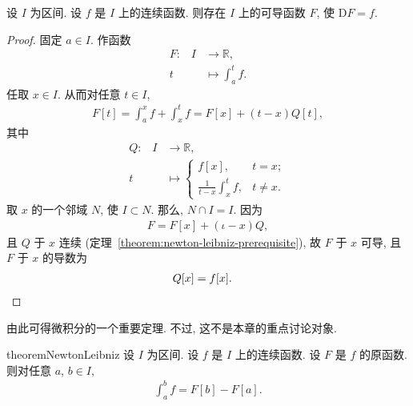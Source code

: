 \begin{theorem}
    设 $I$ 为区间. 设 $f$ 是 $I$ 上的连续函数. 则存在 $I$ 上的可导函数 $F$, 使 $\mathrm{D}F = f$.
\end{theorem}

\begin{proof}
    固定 $a \in I$. 作函数
    \begin{align*}
        \text{$F$:} \quad
        I & \to \mathbb{R},           \\
        t & \mapsto \int_{a}^{t} {f}.
    \end{align*}
    任取 $x \in I$. 从而对任意 $t \in I$,
    \begin{align*}
        F[t] = \int_{a}^{x} {f} + \int_{x}^{t} {f} = F[x] + (t - x) Q [t],
    \end{align*}
    其中
    \begin{align*}
        \text{$Q$:} \quad
        I & \to \mathbb{R},                                                       \\
        t & \mapsto \begin{cases}
                        f[x],                                             & t = x;    \\
                        {\displaystyle \frac{1}{t - x} \int_{x}^{t} {f}}, & t \neq x.
                    \end{cases}
    \end{align*}
    取 $x$ 的一个邻域 $N$, 使 $I \subset N$. 那么, $N \cap I = I$. 因为
    \begin{align*}
        F = F[x] + (\iota - x) Q,
    \end{align*}
    且 $Q$ 于 $x$ 连续 (定理~\ref{theorem:newton-leibniz-prerequisite}), 故 $F$ 于 $x$ 可导, 且 $F$ 于 $x$ 的导数为
    \begin{align*}
         & Q [x] = f[x]. \qedhere
    \end{align*}
\end{proof}

由此可得微积分的一个重要定理. 不过, 这不是本章的重点讨论对象.

\begin{restatable}{theorem}{NewtonLeibniz} \label{theorem:NewtonLeibniz}
    设 $I$ 为区间. 设 $f$ 是 $I$ 上的连续函数. 设 $F$ 是 $f$ 的原函数. 则对任意 $a$, $b \in I$,
    \begin{align*}
        \int_{a}^{b} {f} = F[b] - F[a].
    \end{align*}
\end{restatable}

